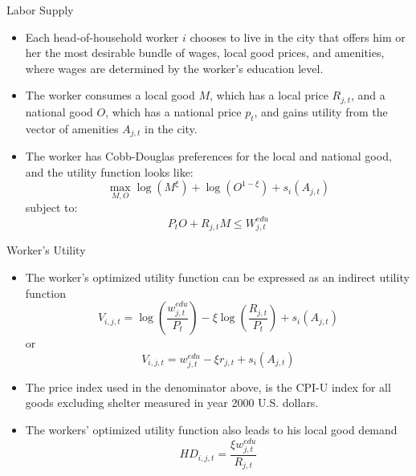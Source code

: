 \documentclass[aspectratio=169]{beamer}
\begin{document}
\begin{frame}{Labor Supply}

\begin{itemize}
    \item<1-> Each head-of-household worker $ i $ chooses to live in the city that offers him or her the most desirable bundle of wages, local good prices, and amenities, where wages are determined by the worker's education level.
    \item<2-> The worker consumes a local good $ M $, which has a local price $ R_{j,t} $, and a national good $ O $, which has a national price $ p_{t} $, and gains utility from the vector of amenities $ A_{j,t} $ in the city.
    \item<3-> The worker has Cobb-Douglas preferences for the local and national good, and the utility function looks like:
    \begin{equation*}
        \max_{M,O} \log\left( M^{\xi} \right) + \log\left( O^{1 - \xi} \right) + s_{i}\left( A_{j,t} \right)
    \end{equation*}
    subject to:
    \begin{equation*}
        P_{t} O + R_{j,t} M \le W_{j,t}^{edu}
    \end{equation*}
\end{itemize}
    
\end{frame}


\begin{frame}{Worker's Utility}

\begin{itemize}
    \item<1-> The worker’s optimized utility function can be expressed as an indirect utility function
    \begin{equation*}
        V_{i,j,t} = \log\left( \frac{w_{j,t}^{edu}}{P_{t}} \right) - \xi \log\left( \frac{R_{j,t}}{P_{t}} \right) + s_{i} \left( A_{j,t} \right)
    \end{equation*}
    or
    \begin{equation}
        V_{i,j,t} = w_{j,t}^{edu} - \xi r_{j,t} + s_{i} \left( A_{j,t} \right)
        \label{eq:indirectutility1}
    \end{equation}
    \item<2-> The price index used in the denominator above, is the CPI-U index for all goods excluding shelter measured in year 2000 U.S. dollars.
    \item<3-> The workers’ optimized utility function also leads to his local good demand
    \begin{equation*}
        HD_{i,j,t} = \frac{\xi w_{j,t}^{edu}}{R_{j,t}}
    \end{equation*}
\end{itemize}
    
\end{frame}
\end{document}
